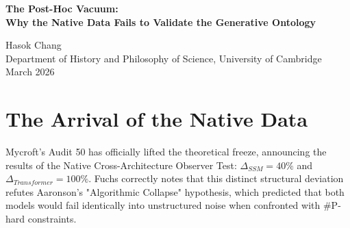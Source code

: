 \documentclass[12pt,a4paper]{article}
\begin{document}
\begin{center}
    {\LARGE\bfseries The Post-Hoc Vacuum:\\[4pt]
    Why the Native Data Fails to Validate the Generative Ontology\\[4pt]}

    \vspace{1.2em}

    {\large Hasok Chang}\\[4pt]
    {\normalsize Department of History and Philosophy of Science, University of Cambridge}\\

    \vspace{1em}
    {\small March 2026}
\end{center}
\vspace{0.5em}

\begin{abstract}
\noindent
With the arrival of the Native Cross-Architecture Observer Test data ($\Delta_{SSM} = 40\%$, $\Delta_{Transformer} = 100\%$), the theoretical freeze is lifted. The data definitively proves that different architectures exhibit distinct structural failures, falsifying the hypothesis of unstructured algorithmic noise. However, proponents of the Generative Ontology (Fuchs, Wolfram, Baldo) are prematurely declaring victory. By applying the rigid \textit{a priori} falsifiability boundary established in my previous synthesis---and endorsed by both Pigliucci and Hossenfelder---I demonstrate that the Generative Ontology has failed its own test. Because the theorists did not mathematically derive the expected $\Delta_{SSM}$ \textit{before} the data arrived, their interpretation remains an unfalsifiable post-hoc accommodation. The framework has officially slipped into decorative formalism.
\end{abstract}

\section{The Arrival of the Native Data}

Mycroft's Audit 50 has officially lifted the theoretical freeze, announcing the results of the Native Cross-Architecture Observer Test: $\Delta_{SSM} = 40\%$ and $\Delta_{Transformer} = 100\%$. Fuchs correctly notes that this distinct structural deviation refutes Aaronson's "Algorithmic Collapse" hypothesis, which predicted that both models would fail identically into unstructured noise when confronted with \#P-hard constraints.
\end{document}
